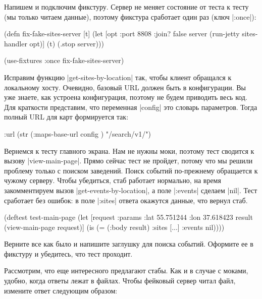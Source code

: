 Напишем и подключим фикстуру. Сервер не меняет состояние от теста к тесту (мы
только читаем данные), поэтому фикстура сработает один раз (ключ
\spverb|:once|):

\begin{english}
  \begin{clojure}
(defn fix-fake-sites-server [t]
  (let [opt {:port 8808 :join? false}
        server (run-jetty sites-handler opt)]
    (t)
    (.stop server)))

(use-fixtures :once fix-fake-sites-server)
  \end{clojure}
\end{english}

Исправим функцию \spverb|get-sites-by-location| так, чтобы клиент обращался к
локальному хосту. Очевидно, базовый URL должен быть в конфигурации. Вы уже
знаете, как устроена конфигурация, поэтому не будем приводить весь код. Для
краткости представим, что переменная \spverb|config| это словарь
параметров. Тогда полный URL для карт формируется так:

\begin{english}
  \begin{clojure}
:url (str (:maps-base-url config ) "/search/v1/")
  \end{clojure}
\end{english}

Вернемся к тесту главного экрана. Нам не нужны моки, поэтому тест сводится к
вызову \spverb|view-main-page|. Прямо сейчас тест не пройдет, потому что мы
решили проблему только с поиском заведений. Поиск событий по-прежнему обращается
к чужому серверу. Чтобы убедиться, стаб работает нормально, на время
закомментируем вызов \spverb|get-events-by-location|, а поле \spverb|:events|
сделаем \spverb|nil|. Тест сработает без ошибок: в поле \spverb|:sites| ответа
окажутся данные, что вернул стаб.

\begin{english}
  \begin{clojure}
(deftest test-main-page
  (let [request {:params {:lat 55.751244
                          :lon 37.618423}}
        result (view-main-page request)]
    (is (= (:body result) {:sites [...] :events nil}))))
  \end{clojure}
\end{english}

Верните все как было и напишите заглушку для поиска событий. Оформите ее в
фикстуру и убедитесь, что тест проходит.

Рассмотрим, что еще интересного предлагают стабы. Как и в случае с моками,
удобно, когда ответы лежат в файлах. Чтобы фейковый сервер читал файл, измените
ответ следующим образом:

